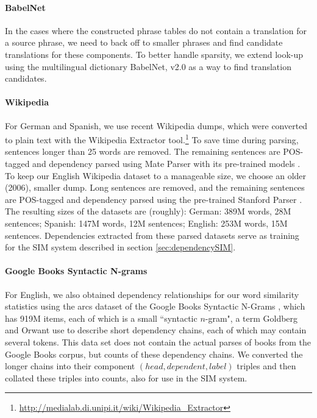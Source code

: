 \documentclass[11pt]{article}
\begin{document}
\paragraph{BabelNet} %

In the cases where the constructed phrase tables do not contain a translation
for a source phrase, we need to back off to smaller phrases and find
candidate translations for these components.  To better handle sparsity, we
extend look-up using the multilingual dictionary BabelNet, v2.0
\cite{Navigli:Ponzetto:12} as a way to find translation candidates.

\paragraph{Wikipedia} %

For German and Spanish, we use recent Wikipedia dumps, which were converted to
plain text with the Wikipedia Extractor
tool.\footnote{\url{http://medialab.di.unipi.it/wiki/Wikipedia_Extractor}} To
save time during parsing, sentences longer than 25 words are removed. The
remaining sentences are POS-tagged and dependency parsed using Mate Parser with
its pre-trained models \cite{bohnet:10,bohnet:kuhn:12,seeker:kuhn:13}. To keep
our English Wikipedia dataset to a manageable size, we choose an older (2006),
smaller dump. Long sentences are removed, and
the remaining sentences are POS-tagged and dependency parsed using the
pre-trained Stanford Parser \cite{klein:manning:03,marneffe:maccartney:ea:06}.
The resulting sizes of the datasets are (roughly): German: 389M words, 28M
sentences; Spanish: 147M words, 12M sentences; English: 253M words, 15M
sentences. Dependencies extracted from these parsed datasets serve as training
for the SIM system described in section \ref{sec:dependencySIM}.

\paragraph{Google Books Syntactic N-grams}

For English, we also obtained dependency relationships for our word similarity
statistics using the arcs dataset of the Google Books Syntactic N-Grams
\cite{goldberg:orwant:13}, which has 919M items, each of which is a small
``syntactic $n$-gram", a term Goldberg and Orwant use to describe short
dependency chains, each of which may contain several tokens. This data set does
not contain the actual parses of books from the Google Books corpus, but counts
of these dependency chains. We converted the longer chains into their component
$(head,dependent,label)$ triples and then collated these triples into counts,
also for use in the SIM system.
\end{document}
